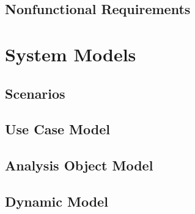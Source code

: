 \subsection{Nonfunctional Requirements}

\section{System Models}
\subsection{Scenarios}
\subsection{Use Case Model}
\subsection{Analysis Object Model}
\subsection{Dynamic Model}
